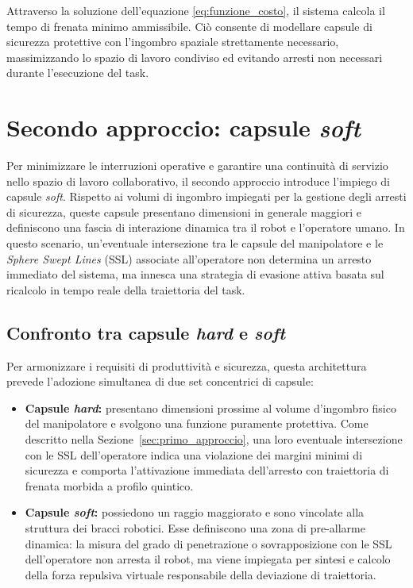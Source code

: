 Attraverso la soluzione dell'equazione \eqref{eq:funzione_costo}, il sistema calcola il tempo di frenata minimo ammissibile. Ciò consente di modellare capsule di sicurezza protettive con l'ingombro spaziale strettamente necessario, massimizzando lo spazio di 
lavoro condiviso ed evitando arresti non necessari durante l'esecuzione del task.

\section{Secondo approccio: capsule \textit{soft}}

Per minimizzare le interruzioni operative e garantire una continuità di servizio nello spazio di lavoro collaborativo, il secondo approccio introduce l'impiego di capsule \textit{soft}. Rispetto ai volumi di ingombro impiegati per la gestione degli arresti di sicurezza, queste capsule presentano dimensioni in generale maggiori e definiscono una fascia di interazione dinamica tra il robot e l'operatore umano. In questo scenario, un'eventuale intersezione tra le capsule del manipolatore e le \textit{Sphere Swept Lines} (SSL) associate all'operatore non determina un arresto immediato del sistema, ma innesca una strategia di evasione attiva basata sul ricalcolo in tempo reale della traiettoria del task\cite{Qyrani2026}.

\subsection{Confronto tra capsule \textit{hard} e \textit{soft}}

Per armonizzare i requisiti di produttività e sicurezza, questa architettura prevede l'adozione simultanea di due set concentrici di capsule:

\begin{itemize}
    \item \textbf{Capsule \textit{hard}:} presentano dimensioni prossime al volume d'ingombro fisico del manipolatore e svolgono una funzione puramente protettiva. Come descritto nella Sezione~\ref{sec:primo_approccio}, una loro eventuale intersezione con le SSL dell'operatore indica una violazione dei margini minimi di sicurezza e comporta l'attivazione immediata dell'arresto con traiettoria di frenata morbida a profilo quintico.
    \item \textbf{Capsule \textit{soft}:} possiedono un raggio maggiorato e sono vincolate alla struttura dei bracci robotici. Esse definiscono una zona di pre-allarme dinamica: la misura del grado di penetrazione o sovrapposizione con le SSL dell'operatore non arresta il robot, ma viene impiegata per sintesi e calcolo della forza repulsiva virtuale responsabile della deviazione di traiettoria.
\end{itemize}

